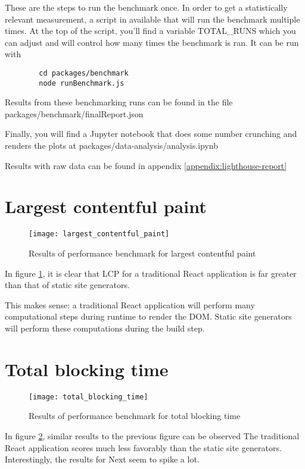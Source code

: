 These are the steps to run the benchmark once. In order to get a statistically relevant measurement, a script in available that will run the benchmark multiple times.
At the top of the script, you'll find a variable TOTAL\_RUNS which you can adjust and will control how many times the benchmark is ran.
It can be run with

\begin{verbatim}
		cd packages/benchmark
		node runBenchmark.js
\end{verbatim}

Results from these benchmarking runs can be found in the file packages/benchmark/finalReport.json

Finally, you will find a Jupyter notebook that does some number crunching and renders the plots at packages/data-analysis/analysis.ipynb

Results with raw data can be found in appendix \ref{appendix:lighthouse-report}

\section{Largest contentful paint}

\begin{figure}[htb!]
	\texttt{[image: largest\_contentful\_paint]}{}
	\caption{Results of performance benchmark for largest contentful paint}
	\label{fig:largest_contentful_paint}
\end{figure}

In figure \ref{fig:largest_contentful_paint}, it is clear that LCP for a traditional React application is far greater than that of static site generators.

This makes sense: a traditional React application will perform many computational steps during runtime to render the DOM.
Static site generators will perform these computations during the build step.

\section{Total blocking time}


\begin{figure}[htb!]
	\texttt{[image: total\_blocking\_time]}
	\caption{Results of performance benchmark for total blocking time}
	\label{fig:total_blocking_time}
\end{figure}

In figure \ref{fig:total_blocking_time}, similar results to the previous figure can be observed
The traditional React application scores much less favorably than the static site generators.
Interestingly, the results for Next seem to spike a lot.

